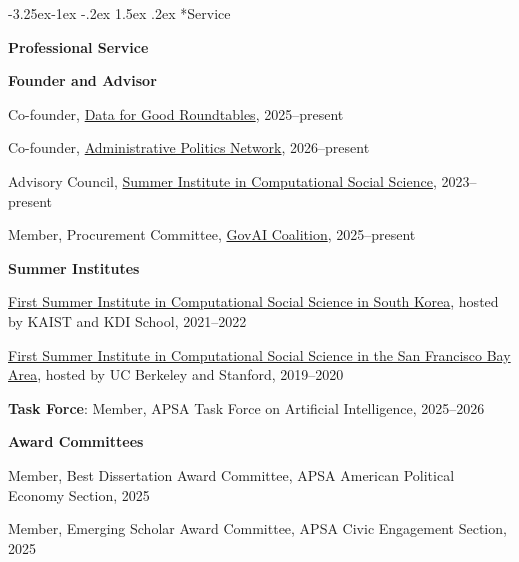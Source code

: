 \documentclass[10pt, letterpaper]{article}
\makeatletter
\renewcommand\subsection{\@startsection{subsection}{2}{\z@}%
  {-3.25ex\@plus -1ex \@minus -.2ex}%
  {1.5ex \@plus .2ex}%
  {\normalfont\large\bfseries\color{cvnavy}}}
\renewenvironment{itemize}{
\begin{list}{}{
        \setlength{\leftmargin}{1.5em}
        \setlength{\itemsep}{0.10em}
        \setlength{\parskip}{0pt}
        \setlength{\parsep}{0.10em}
    }
}{
\end{list}
}
\makeatother
\begin{document}
\subsection*{Service}

\textbf{Professional Service}

\begin{itemize}

  \item \textbf{Founder and Advisor}  
  \begin{itemize}
    \item Co-founder, \href{https://sites.google.com/view/d4g-roundtables?usp=sharing}{Data for Good Roundtables}, 2025--present
    \item Co-founder, \href{https://sites.google.com/view/apnetwork/home}{Administrative Politics Network}, 2026--present
    \item Advisory Council, \href{https://sicss.io/people}{Summer Institute in Computational Social Science}, 2023--present
    \item Member, 
    Procurement Committee, \href{https://www.sanjoseca.gov/your-government/departments-offices/information-technology/artificial-intelligence-inventory/govai-coalition/committees-working-groups}{GovAI Coalition}, 2025--present 
  \end{itemize}

  \item \textbf{Summer Institutes}  
  \begin{itemize}
    \item \href{https://sicss.io/2022/korea/}{First Summer Institute in Computational Social Science in South Korea}, hosted by KAIST and KDI School, 2021--2022 
    \item \href{https://compsocialscience.github.io/summer-institute/2020/bay_area/}{First Summer Institute in Computational Social Science in the San Francisco Bay Area}, hosted by UC Berkeley and Stanford, 2019--2020
  \end{itemize}

\item \textbf{Task Force}: Member, APSA Task Force on Artificial Intelligence, 2025--2026
  
  \item \textbf{Award Committees}  
  \begin{itemize}
    \item Member, Best Dissertation Award Committee, APSA American Political Economy Section, 2025
    \item Member, Emerging Scholar Award Committee, APSA Civic Engagement Section, 2025
  \end{itemize}


\end{itemize}
\end{document}
